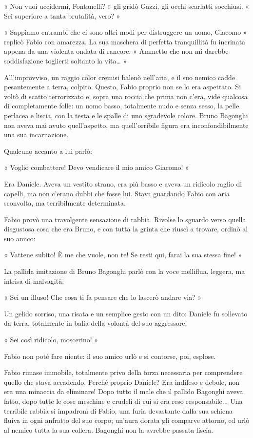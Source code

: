 « Non vuoi uccidermi, Fontanelli? » gli gridò Gazzi, gli occhi scarlatti socchiusi. « Sei superiore a tanta brutalità, vero? »

« Sappiamo entrambi che ci sono altri modi per distruggere un uomo, Giacomo » replicò Fabio con amarezza. La sua maschera di perfetta tranquillità fu incrinata appena da una violenta ondata di rancore. « Ammetto che non mi darebbe soddisfazione toglierti soltanto la vita… »

All'improvviso, un raggio color cremisi balenò nell'aria, e il suo nemico cadde pesantemente a terra, colpito. Questo, Fabio proprio non se lo era aspettato. Si voltò di scatto terrorizzato e, sopra una roccia che prima non c'era, vide qualcosa di completamente folle: un uomo basso, totalmente nudo e senza sesso, la pelle perlacea e liscia, con la testa e le spalle di uno sgradevole colore. Bruno Bagonghi non aveva mai avuto quell'aspetto, ma quell'orribile figura era inconfondibilmente una sua incarnazione.

Qualcuno accanto a lui parlò:

« Voglio combattere! Devo vendicare il mio amico Giacomo! »

Era Daniele. Aveva un vestito strano, era più basso e aveva un ridicolo raglio di capelli, ma non c'erano dubbi che fosse lui. Stava guardando Fabio con aria sconvolta, ma terribilmente determinata.

Fabio provò una travolgente sensazione di rabbia. Rivolse lo sguardo verso quella disgustosa cosa che era Bruno, e con tutta la grinta che riuscì a trovare, ordinò al suo amico:

« Vattene subito! È me che vuole, non te! Se resti qui, farai la sua stessa fine! »

La pallida imitazione di Bruno Bagonghi parlò con la voce melliflua, leggera, ma intrisa di malvagità:

« Sei un illuso! Che cosa ti fa pensare che lo lascerò andare via? »

Un gelido sorriso, una risata e un semplice gesto con un dito: Daniele fu sollevato da terra, totalmente in balia della volontà del suo aggressore.

« Sei così ridicolo, moscerino! »

Fabio non poté fare niente: il suo amico urlò e si contorse, poi, esplose.

Fabio rimase immobile, totalmente privo della forza necessaria per comprendere quello che stava accadendo. Perché proprio Daniele? Era indifeso e debole, non era una minaccia da eliminare! Dopo tutto il male che il pallido Bagonghi aveva fatto, dopo tutte le cose meschine e crudeli di cui si era reso responsabile... Una terribile rabbia si impadronì di Fabio, una furia devastante dalla sua schiena fluiva in ogni anfratto del suo corpo; un'aura dorata gli comparve attorno, ed urlò al nemico tutta la sua collera. Bagonghi non la avrebbe passata liscia.

